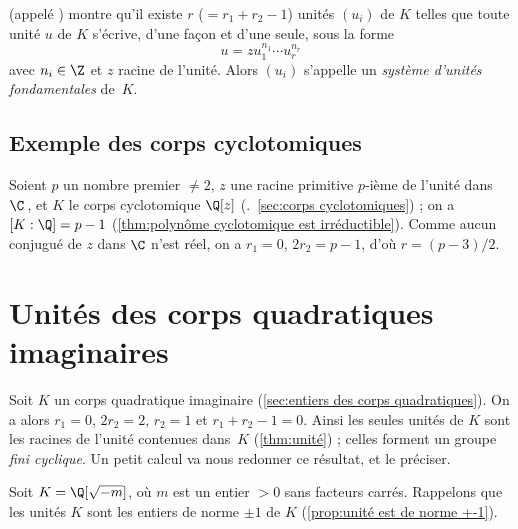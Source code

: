 \documentclass[11pt, useosf,
  title in boldface,
  theorem in new line,
  theorem numbering = section,
  number theorems separately,
]{simplivre}
\begin{document}
    \begin{remark}
         (appelé ) montre qu'il existe \( r \) (\( = r_1+r_2-1 \)) unités \( (u_i) \) de \( K \) telles que toute unité \( u \) de \( K \) s'écrive, d'une façon et d'une seule, sous la forme
        \vspace{-.2\baselineskip}%
        \begin{equation}
            u = z u_1^{n_1} \cdots u_r^{n_r}
        \end{equation}
        avec \( n_i \in \Z \) et \( z \) racine de l'unité. Alors \( (u_i) \) s'appelle un \emph{système d'unités fondamentales} de~\( K \).
    \end{remark}

    \subsection*{Exemple des corps cyclotomiques}
        Soient \( p \) un nombre premier \( \neq 2 \), \( z \) une racine primitive \( p \)‑ième de l'unité dans \( \C \)\,, et \( K \) le corps cyclotomique \( \Q[z] \) (\cf.~\cref{sec:corps cyclotomiques}) ; on a \( [K:\Q] = p-1 \) (\cref{thm:polynôme cyclotomique est irréductible}). Comme aucun conjugué de \( z \) dans \( \C \) n'est réel, on a \( r_1 = 0 \), \( 2 r_2 = p-1 \), d'où \( r = (p-3)/2 \).

\section{Unités des corps quadratiques imaginaires}

    Soit \( K \) un corps quadratique imaginaire (\cref{sec:entiers des corps quadratiques}). On a alors \( r_1 = 0 \), \( 2r_2 = 2 \), \( r_2 = 1 \) et \( r_1+r_2-1 = 0 \). Ainsi les seules unités de \( K \) sont les racines de l'unité contenues dans~\( K \) (\cref{thm:unité}) ; celles forment un groupe \emph{fini cyclique}. Un petit calcul va nous redonner ce résultat, et le préciser.

    Soit \( K = \Q[\sqrt{-m}] \), où \( m \) est un entier \( > 0 \) sans facteurs carrés. Rappelons que les unités \( K \) sont les entiers de norme \( \pm 1 \) de \( K \) (\cref{prop:unité est de norme +-1}).
\end{document}
